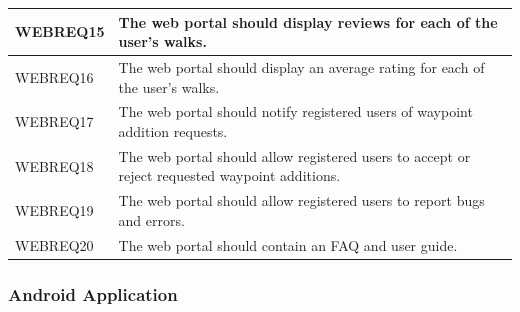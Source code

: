 \documentclass[11pt,a4paper]{article}
\begin{document}
\begin{longtable}{|p{2.5cm}p{13cm}|}
WEBREQ15 & The web portal should display reviews for each of the user's walks. \\ \hline
WEBREQ16 & The web portal should display an average rating for each of the user's walks. \\ \hline
WEBREQ17 & The web portal should notify registered users of waypoint addition requests. \\ \hline
WEBREQ18 & The web portal should allow registered users to accept or reject requested waypoint additions. \\ \hline
WEBREQ19 & The web portal should allow registered users to report bugs and errors. \\ \hline
WEBREQ20 & The web portal should contain an FAQ and user guide. \\ \hline
\end{longtable}

\subsubsection{Android Application}
\end{document}
